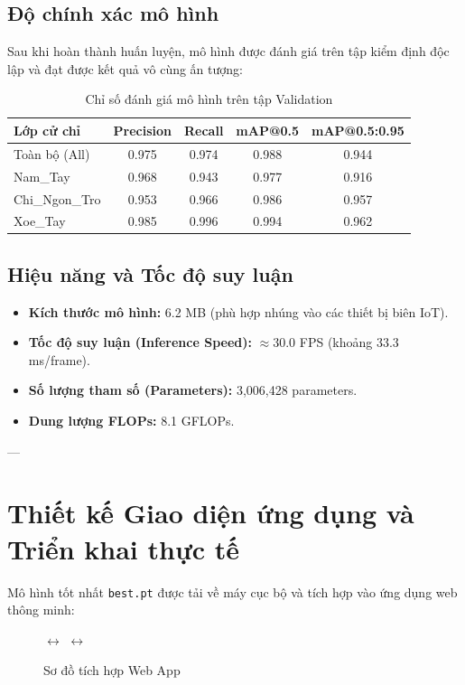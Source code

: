 \documentclass[12pt,a4paper]{article}
\begin{document}
\subsection{Độ chính xác mô hình}
Sau khi hoàn thành huấn luyện, mô hình được đánh giá trên tập kiểm định độc lập và đạt được kết quả vô cùng ấn tượng:
\begin{table}[H]
    \centering
    \caption{Chỉ số đánh giá mô hình trên tập Validation}
    \begin{tabular}{lcccc}
        \toprule
        \textbf{Lớp cử chỉ} & \textbf{Precision} & \textbf{Recall} & \textbf{mAP@0.5} & \textbf{mAP@0.5:0.95} \\
        \midrule
        Toàn bộ (All) & 0.975 & 0.974 & 0.988 & 0.944 \\
        Nam\_Tay & 0.968 & 0.943 & 0.977 & 0.916 \\
        Chi\_Ngon\_Tro & 0.953 & 0.966 & 0.986 & 0.957 \\
        Xoe\_Tay & 0.985 & 0.996 & 0.994 & 0.962 \\
        \bottomrule
    \end{tabular}
\end{table}

\subsection{Hiệu năng và Tốc độ suy luận}
\begin{itemize}
    \item \textbf{Kích thước mô hình:} 6.2 MB (phù hợp nhúng vào các thiết bị biên IoT).
    \item \textbf{Tốc độ suy luận (Inference Speed):} $\approx 30.0$ FPS (khoảng 33.3 ms/frame).
    \item \textbf{Số lượng tham số (Parameters):} 3,006,428 parameters.
    \item \textbf{Dung lượng FLOPs:} 8.1 GFLOPs.
\end{itemize}

---

\section{Thiết kế Giao diện ứng dụng và Triển khai thực tế}
Mô hình tốt nhất \texttt{best.pt} được tải về máy cục bộ và tích hợp vào ứng dụng web thông minh:
\begin{figure}[H]
    \centering
     $\leftrightarrow$  $\leftrightarrow$ 
    \caption{Sơ đồ tích hợp Web App}
\end{figure}
\end{document}
